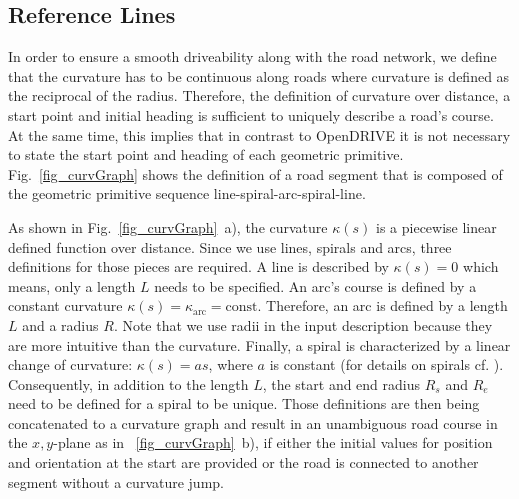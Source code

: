 \documentclass[a4paper, 10pt, conference]{ieeeconf}      %
\begin{document}
\subsection{Reference Lines} \label{sec_refline} %
In order to ensure a smooth driveability along with the road network, we define that the curvature has to be continuous along roads where curvature is defined as the reciprocal of the radius. Therefore, the definition of curvature over distance, a start point and initial heading is sufficient to uniquely describe a road's course. At the same time, this implies that in contrast to OpenDRIVE it is not necessary to state the start point and heading of each geometric primitive. Fig.~\ref{fig_curvGraph} shows the definition of a road segment that is composed of the geometric primitive sequence line-spiral-arc-spiral-line.

As shown in Fig.~\ref{fig_curvGraph}~a), the curvature $\kappa(s)$ is a piecewise linear defined function over distance. Since we use lines, spirals and arcs, three definitions for those pieces are required. A line is described by $\kappa(s) = 0$ which means, only a length $L$ needs to be specified. An arc's course is defined by a constant curvature $\kappa(s) = \kappa_\text{arc} = \text{const}$. Therefore, an arc is defined by a length $L$ and a radius $R$. Note that we use radii in the input description because they are more intuitive than the curvature. Finally, a spiral is characterized by a linear change of curvature: $\kappa(s) = a s$, where $a$ is constant (for details on spirals cf. \cite{Baier.2008}). Consequently, in addition to the length $L$, the start and end radius $R_s$ and $R_e$ need to be defined for a spiral to be unique. Those definitions are then being concatenated to a curvature graph and result in an unambiguous road course in the $x,y$-plane as in ~\ref{fig_curvGraph}~b), if either the initial values for position and orientation at the start are provided or the road is connected to another segment without a curvature jump.
\end{document}
